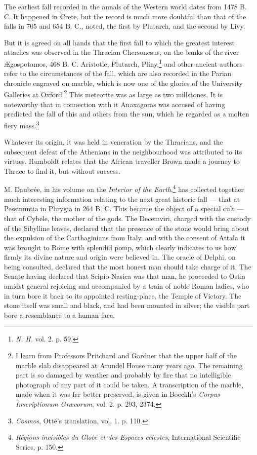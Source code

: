 \documentclass[a4paper, 12pt, oneside, polutonikogreek, english]{article}
\begin{document}
The earliest fall recorded in the annals of the Western world dates from 1478 B. C. It happened in Crete, but the record is much more doubtful than that of the falls in 705 and 654 B. C., noted, the first by Plutarch, and the second by Livy.

But it is agreed on all hands that the first fall to which the greatest interest attaches was observed in the Thracian Chersonesus, on the banks of the river Ægospotamos, 468 B. C. Aristotle, Plutarch, Pliny,\footnote{\emph{N. H.} vol. 2. p. 59.} and other ancient authors refer to the circumstances of the fall, which are also recorded in the Parian chronicle engraved on marble, which is now one of the glories of the University Galleries at Oxford.\footnote{I learn from Professors Pritchard and Gardner that the upper half of the marble slab disappeared at Arundel House many years ago. The remaining part is so damaged by weather and probably by fire that no intelligible photograph of any part of it could be taken. A transcription of the marble, made when it was far better preserved, is given in Boeckh's \emph{Corpus Inscriptionum Græcorum}, vol. 2. p. 293, 2374.} This meteorite was as large as two millstones. It is noteworthy that in connection with it Anaxagoras was accused of having predicted the fall of this and others from the sun, which he regarded as a molten fiery mass.\footnote{\emph{Cosmos}, Otté's translation, vol. 1. p. 110.}

Whatever its origin, it was held in veneration by the Thracians, and the subsequent defeat of the Athenians in the neighbourhood was attributed to its virtues. Humboldt relates that the African traveller Brown made a journey to Thrace to find it, but without success.

M. Daubrée, in his volume on the \emph{Interior of the Earth},\footnote{\emph{Régions invisibles du Globe et des Espaces célestes}, International Scientific Series, p. 150.} has collected together much interesting information relating to the next great historic fall --- that at Pessinuntia in Phrygia in 264 B. C. This became the object of a special cult --- that of Cybele, the mother of the gods. The Decemviri, charged with the custody of the Sibylline leaves, declared that the presence of the stone would bring about the expulsion of the Carthaginians from Italy, and with the consent of Attala it was brought to Rome with splendid pomp, which clearly indicates to us how firmly its divine nature and origin were believed in. The oracle of Delphi, on being consulted, declared that the most honest man should take charge of it. The Senate having declared that Scipio Nasica was that man, he proceeded to Ostia amidst general rejoicing and accompanied by a train of noble Roman ladies, who in turn bore it back to its appointed resting-place, the Temple of Victory. The stone itself was small and black, and had been mounted in silver; the visible part bore a resemblance to a human face.
\end{document}
